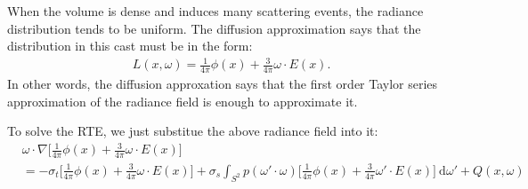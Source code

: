 \documentclass[10pt]{article}
\newcommand{\dee}{\mathrm{d}}
\begin{document}
  When the volume is dense and induces many scattering events, the radiance distribution tends to be uniform.  The diffusion approximation says that the distribution in this cast must be in the form:
  \begin{align*}
  	L(x,\omega) = \frac{1}{4\pi}\phi(x) + \frac{3}{4\pi} \omega \cdot E(x).
  \end{align*}
  In other words, the diffusion approxation says that the first order Taylor series approximation of the radiance field is enough to approximate it.

  To solve the RTE, we just substitue the above radiance field into it:
  \begin{align*}
  	&\omega \cdot \nabla \bigg[ \frac{1}{4\pi}\phi(x) + \frac{3}{4\pi} \omega \cdot E(x) \bigg] \\
  	&= -\sigma_t \bigg[ \frac{1}{4\pi}\phi(x) + \frac{3}{4\pi} \omega \cdot E(x) \bigg] + \sigma_s \int_{S^2} p(\omega' \cdot \omega) \bigg[ \frac{1}{4\pi}\phi(x) + \frac{3}{4\pi} \omega' \cdot E(x) \bigg] \ \dee\omega' + Q(x,\omega)
  \end{align*}


  
    
\end{document}
